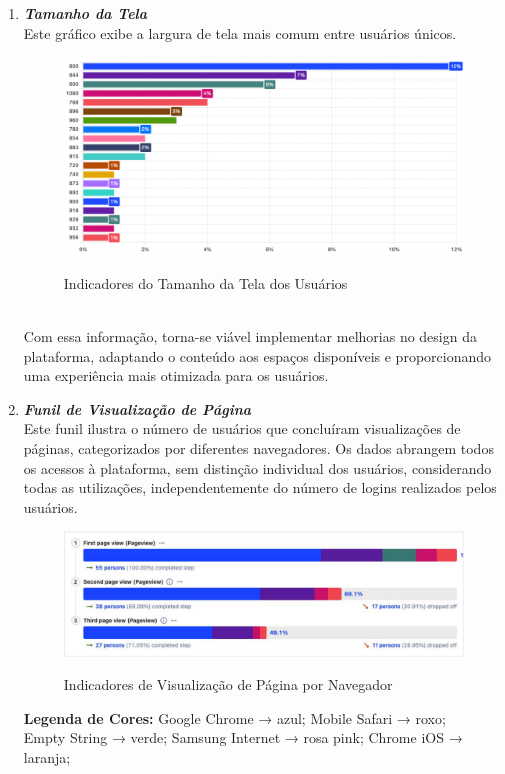 \begin{enumerate}
\begin{enumerate}
\item\textit{\textbf{Tamanho da Tela}}\\
 Este gráfico exibe a largura de tela mais comum entre usuários únicos.\\
\begin{figure}[!ht]
    \centering
    \includegraphics[scale=0.45]{latex/figuras/tela.pdf}
    \label{tela}
    \caption[Tamanho da Tela]{Indicadores do Tamanho da Tela dos Usuários}
    \label{fig:enter-label}
\end{figure}\\
Com essa informação, torna-se viável implementar melhorias no design da plataforma, adaptando o conteúdo aos espaços disponíveis e proporcionando uma experiência mais otimizada para os usuários.
 
\item\textit{\textbf{Funil de Visualização de Página}}\\
 Este funil ilustra o número de usuários que concluíram visualizações de páginas, categorizados por diferentes navegadores. Os dados abrangem todos os acessos à plataforma, sem distinção individual dos usuários, considerando todas as utilizações, independentemente do número de logins realizados pelos usuários.\\
 
\begin{figure}[!ht]
    \centering
    \includegraphics[scale=0.45]{latex/figuras/page.pdf}
    \label{page}
    \caption[Funil de Visualização]{Indicadores de Visualização de Página por Navegador}
    \label{fig:enter-label}
\end{figure}
\textbf{\textbf{Legenda de Cores:}} Google Chrome → azul; Mobile Safari → roxo;\\Empty String → verde; Samsung Internet → rosa pink; Chrome iOS → laranja;\\


\end{enumerate}
\end{enumerate}
